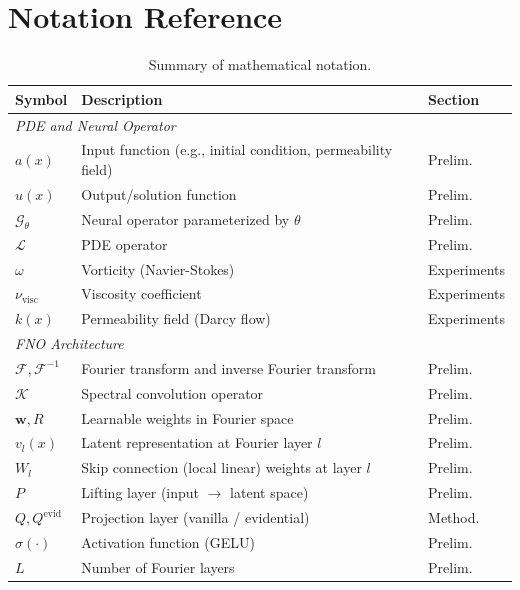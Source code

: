 \appendices

\section{Notation Reference}
\label{app:notation}


\begin{table}[!ht]
\centering
\caption{Summary of mathematical notation.}
\label{tab:notation}
\begin{tabular}{lll}
\toprule
\textbf{Symbol} & \textbf{Description} & \textbf{Section} \\
\midrule
\multicolumn{3}{l}{\textit{PDE and Neural Operator}} \\
$a(x)$ & Input function (e.g., initial condition, permeability field) & Prelim. \\
$u(x)$ & Output/solution function & Prelim. \\
$\mathcal{G}_\theta$ & Neural operator parameterized by $\theta$ & Prelim. \\
$\mathcal{L}$ & PDE operator & Prelim. \\
$\omega$ & Vorticity (Navier-Stokes) & Experiments \\
$\nu_{\text{visc}}$ & Viscosity coefficient & Experiments \\
$k(x)$ & Permeability field (Darcy flow) & Experiments \\
\midrule
\multicolumn{3}{l}{\textit{FNO Architecture}} \\
$\mathcal{F}, \mathcal{F}^{-1}$ & Fourier transform and inverse Fourier transform & Prelim. \\
$\mathcal{K}$ & Spectral convolution operator & Prelim. \\
$\mathbf{w}, R$ & Learnable weights in Fourier space & Prelim. \\
$v_l(x)$ & Latent representation at Fourier layer $l$ & Prelim. \\
$W_l$ & Skip connection (local linear) weights at layer $l$ & Prelim. \\
$P$ & Lifting layer (input $\rightarrow$ latent space) & Prelim. \\
$Q, Q^{\text{evid}}$ & Projection layer (vanilla / evidential) & Method. \\
$\sigma(\cdot)$ & Activation function (GELU) & Prelim. \\
$L$ & Number of Fourier layers & Prelim. \\

\end{tabular}
\end{table}

